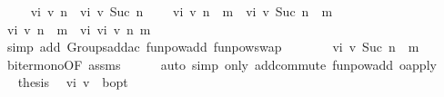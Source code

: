 \begin{isabellebody}
\isanewline
\isanewline
{}\isamarkupfalse%
\ \isanewline
\ \ \ {\isachardoublequoteopen}vi\ v\ n\ {\isasymle}\ vi\ v\ {\isacharparenleft}{\kern0pt}Suc\ n{\isacharparenright}{\kern0pt}{\isachardoublequoteclose}\ \isanewline
\ \ \ {\isachardoublequoteopen}vi\ v\ {\isacharparenleft}{\kern0pt}n\ {\isacharplus}{\kern0pt}\ m{\isacharparenright}{\kern0pt}\ {\isasymle}\ vi\ v\ {\isacharparenleft}{\kern0pt}Suc\ n\ {\isacharplus}{\kern0pt}\ m{\isacharparenright}{\kern0pt}{\isachardoublequoteclose}\isanewline
%
\isadelimproof
%
\endisadelimproof
%
\isatagproof
{}\isamarkupfalse%
\ {\isacharminus}{\kern0pt}\isanewline
\ \ \isamarkupfalse%
\ {\isachardoublequoteopen}vi\ v\ {\isacharparenleft}{\kern0pt}n\ {\isacharplus}{\kern0pt}\ m{\isacharparenright}{\kern0pt}\ {\isasymle}\ vi\ {\isacharparenleft}{\kern0pt}vi\ v\ n{\isacharparenright}{\kern0pt}\ m{\isachardoublequoteclose}\isanewline
\ \ \ \ \isamarkupfalse%
\ {\isacharparenleft}{\kern0pt}simp\ add{\isacharcolon}{\kern0pt}\ Groups{\isachardot}{\kern0pt}add{\isacharunderscore}{\kern0pt}ac{\isacharparenleft}{\kern0pt}{}{\isacharparenright}{\kern0pt}\ funpow{\isacharunderscore}{\kern0pt}add\ funpow{\isacharunderscore}{\kern0pt}swap{}{\isacharparenright}{\kern0pt}\isanewline
\ \ \isamarkupfalse%
\ \isamarkupfalse%
\ {\isachardoublequoteopen}{\isasymdots}\ {\isasymle}\ vi\ v\ {\isacharparenleft}{\kern0pt}Suc\ n\ {\isacharplus}{\kern0pt}\ m{\isacharparenright}{\kern0pt}{\isachardoublequoteclose}\isanewline
\ \ \ \ \isamarkupfalse%
\ {\isasymL}\isactrlsub b{\isacharunderscore}{\kern0pt}iter{\isacharunderscore}{\kern0pt}mono{\isacharbrackleft}{\kern0pt}OF\ assms{\isacharbrackright}{\kern0pt}\isanewline
\ \ \ \ \isamarkupfalse%
\ {\isacharparenleft}{\kern0pt}auto\ simp\ only{\isacharcolon}{\kern0pt}\ add{\isachardot}{\kern0pt}commute\ funpow{\isacharunderscore}{\kern0pt}add\ o{\isacharunderscore}{\kern0pt}apply{\isacharparenright}{\kern0pt}\isanewline
\ \ \isamarkupfalse%
\ \isamarkupfalse%
\ {\isacharquery}{\kern0pt}thesis\ \isacommand{{\isachardot}{\kern0pt}}\isamarkupfalse%
\isanewline
{}\isamarkupfalse%
%
\endisatagproof
{\isafoldproof}%
%
\isadelimproof
\isanewline
%
\endisadelimproof
\isanewline
\isanewline
\isanewline
{}\isamarkupfalse%
\ {\isachardoublequoteopen}vi\ v\ {\isasymlonglonglongrightarrow}\ {\isasymnu}\isactrlsub b{\isacharunderscore}{\kern0pt}opt{\isachardoublequoteclose}\isanewline

\end{isabellebody}
